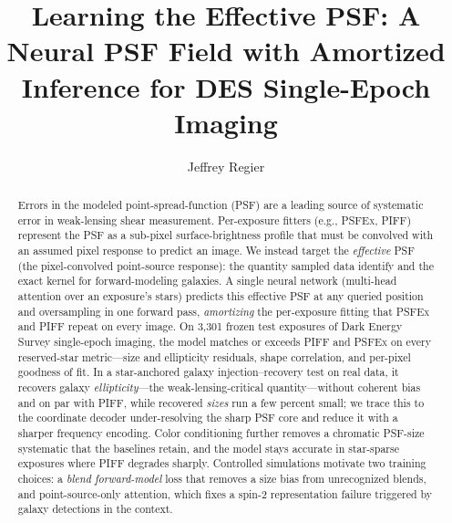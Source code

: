 \documentclass[twocolumn]{aastex701}
\begin{document}
\title{Learning the Effective PSF: A Neural PSF Field with Amortized
Inference for DES Single-Epoch Imaging}

\author{Jeffrey Regier}


\begin{abstract}
Errors in the modeled point-spread-function (PSF) are a leading source of systematic error
in weak-lensing shear measurement. Per-exposure fitters (e.g., \textsc{PSFEx}, \textsc{PIFF}) represent
the PSF as a sub-pixel surface-brightness profile that must be convolved with an assumed
pixel response to predict an image. We instead target the \emph{effective} PSF (the
pixel-convolved point-source response): the quantity sampled data identify and the exact
kernel for forward-modeling galaxies. A single neural network (multi-head
attention over an exposure's stars) predicts this effective PSF at any queried position
and oversampling in one forward pass, \emph{amortizing} the per-exposure fitting that
\textsc{PSFEx} and \textsc{PIFF} repeat on every image.
On 3{,}301 frozen test exposures of Dark Energy Survey single-epoch imaging, the model
matches or exceeds \textsc{PIFF} and \textsc{PSFEx} on every reserved-star metric---size
and ellipticity residuals, shape correlation, and per-pixel goodness of fit. In a
star-anchored galaxy injection--recovery test on real data, it recovers galaxy
\emph{ellipticity}---the weak-lensing-critical quantity---without coherent bias and on par
with \textsc{PIFF}, while recovered \emph{sizes} run a few percent small; we trace this to
the coordinate decoder under-resolving the sharp PSF core and reduce it with a sharper
frequency encoding. Color conditioning further removes a chromatic PSF-size systematic
that the baselines retain, and the model stays accurate in star-sparse exposures where
\textsc{PIFF} degrades sharply. Controlled simulations motivate two training choices: a
\emph{blend forward-model} loss that removes a size bias from unrecognized blends, and
point-source-only attention, which fixes a spin-2 representation failure triggered by
galaxy detections in the context.
\end{abstract}

\end{document}
